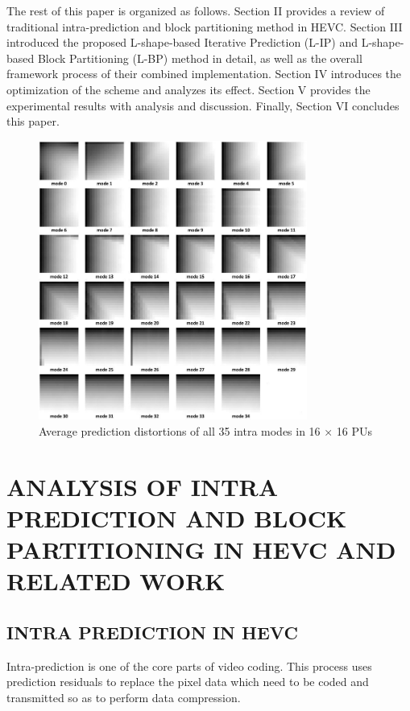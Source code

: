 \documentclass[journal]{IEEEtran}
\begin{document}
The rest of this paper is organized as follows. Section II provides a review of traditional intra-prediction and block partitioning method in HEVC. Section III introduced the proposed L-shape-based Iterative Prediction (L-IP) and L-shape-based Block Partitioning (L-BP) method in detail, as well as the overall framework process of their combined implementation. Section IV introduces the optimization of the scheme and analyzes its effect. Section V provides the experimental results with analysis and discussion. Finally, Section VI concludes this paper.

\begin{figure}[tp]
    \centering
    \includegraphics[width=8.8cm]{pictures/residual}
    \caption{Average prediction distortions of all 35 intra modes in 16 × 16 PUs}

    \label{fig:residual}
\end{figure}
\section{ANALYSIS OF INTRA PREDICTION AND BLOCK PARTITIONING IN HEVC AND RELATED WORK}

\subsection{INTRA PREDICTION IN HEVC}
Intra-prediction is one of the core parts of video coding. This process uses prediction residuals to replace the pixel data which need to be coded and transmitted so as to perform data compression.
\end{document}
